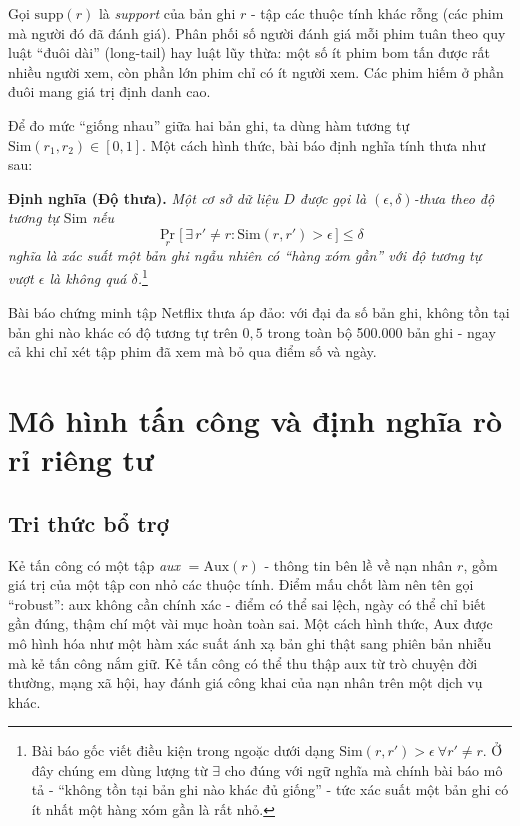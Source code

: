 Gọi $\mathrm{supp}(r)$ là \textit{support} của bản ghi $r$ - tập các thuộc tính khác rỗng (các phim mà người đó đã đánh giá). Phân phối số người đánh giá mỗi phim tuân theo quy luật ``đuôi dài'' (long-tail) hay luật lũy thừa: một số ít phim bom tấn được rất nhiều người xem, còn phần lớn phim chỉ có ít người xem. Các phim hiếm ở phần đuôi mang giá trị định danh cao.

Để đo mức ``giống nhau'' giữa hai bản ghi, ta dùng hàm tương tự $\mathrm{Sim}(r_1, r_2) \in [0,1]$. Một cách hình thức, bài báo định nghĩa tính thưa như sau:

\vspace{0.2cm}
\noindent\textbf{Định nghĩa (Độ thưa).} \textit{Một cơ sở dữ liệu $D$ được gọi là $(\epsilon, \delta)$-thưa theo độ tương tự $\mathrm{Sim}$ nếu}
\begin{equation}
	\Pr_{r}\big[\, \exists\, r' \neq r : \mathrm{Sim}(r, r') > \epsilon \,\big] \le \delta
\end{equation}
\textit{nghĩa là xác suất một bản ghi ngẫu nhiên có ``hàng xóm gần'' với độ tương tự vượt $\epsilon$ là không quá $\delta$.}\footnote{Bài báo gốc viết điều kiện trong ngoặc dưới dạng $\mathrm{Sim}(r,r')>\epsilon\ \forall r'\neq r$. Ở đây chúng em dùng lượng từ $\exists$ cho đúng với ngữ nghĩa mà chính bài báo mô tả - ``không tồn tại bản ghi nào khác đủ giống'' - tức xác suất một bản ghi có ít nhất một hàng xóm gần là rất nhỏ.}

\vspace{0.2cm}
Bài báo chứng minh tập Netflix thưa áp đảo: với đại đa số bản ghi, không tồn tại bản ghi nào khác có độ tương tự trên $0{,}5$ trong toàn bộ 500.000 bản ghi - ngay cả khi chỉ xét tập phim đã xem mà bỏ qua điểm số và ngày.

\section{Mô hình tấn công và định nghĩa rò rỉ riêng tư}

\subsection{Tri thức bổ trợ}
Kẻ tấn công có một tập \textit{aux} $= \mathrm{Aux}(r)$ - thông tin bên lề về nạn nhân $r$, gồm giá trị của một tập con nhỏ các thuộc tính. Điểm mấu chốt làm nên tên gọi ``robust'': aux không cần chính xác - điểm có thể sai lệch, ngày có thể chỉ biết gần đúng, thậm chí một vài mục hoàn toàn sai. Một cách hình thức, $\mathrm{Aux}$ được mô hình hóa như một hàm xác suất ánh xạ bản ghi thật sang phiên bản nhiễu mà kẻ tấn công nắm giữ. Kẻ tấn công có thể thu thập aux từ trò chuyện đời thường, mạng xã hội, hay đánh giá công khai của nạn nhân trên một dịch vụ khác.

